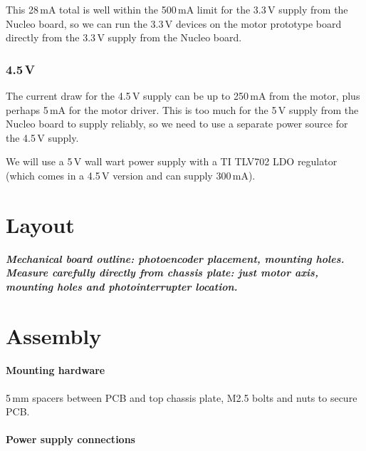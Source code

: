 \documentclass[a4paper,11pt,article]{memoir}
\newcommand{\todo}[1]{{\color{red}\textit{\textbf{#1}}}}
\begin{document}
This 28\,mA total is well within the 500\,mA limit for the 3.3\,V
supply from the Nucleo board, so we can run the 3.3\,V devices on the
motor prototype board directly from the 3.3\,V supply from the Nucleo board.

\subsubsection{4.5\,V}

The current draw for the 4.5\,V supply can be up to 250\,mA from the
motor, plus perhaps 5\,mA for the motor driver. This is too much for
the 5\,V supply from the Nucleo board to supply reliably, so we need
to use a separate power source for the 4.5\,V supply.

We will use a 5\,V wall wart power supply with a TI TLV702 LDO
regulator (which comes in a 4.5\,V version and can supply 300\,mA).


\section*{Layout}

\todo{Mechanical board outline: photoencoder placement, mounting
  holes. Measure carefully directly from chassis plate: just motor
  axis, mounting holes and photointerrupter location.}


\section*{Assembly}

\paragraph{Mounting hardware}

5\,mm spacers between PCB and top chassis plate, M2.5 bolts and nuts
to secure PCB.

\paragraph{Power supply connections}
\end{document}
